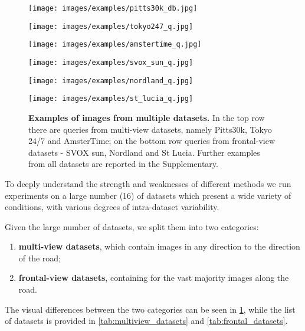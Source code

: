\documentclass[10pt,twocolumn,letterpaper]{article}
\begin{document}
 
\begin{figure}
    \begin{center}
    \begin{minipage}{.15\textwidth}
        \texttt{[image: images/examples/pitts30k\_db.jpg]}
    \end{minipage}
    \begin{minipage}{.15\textwidth}
        \texttt{[image: images/examples/tokyo247\_q.jpg]}
    \end{minipage}
    \begin{minipage}{.15\textwidth}
        \texttt{[image: images/examples/amstertime\_q.jpg]}
    \end{minipage}
    \begin{minipage}{.15\textwidth}
        \texttt{[image: images/examples/svox\_sun\_q.jpg]}
    \end{minipage}
    \begin{minipage}{.15\textwidth}
    \texttt{[image: images/examples/nordland\_q.jpg]}
    \end{minipage}
    \begin{minipage}{.15\textwidth}
    \texttt{[image: images/examples/st\_lucia\_q.jpg]}
    \end{minipage}
    \end{center}
    \caption{\textbf{Examples of images from multiple datasets.} In the top row there are queries from multi-view datasets, namely Pitts30k, Tokyo 24/7 and AmsterTime; on the bottom row queries from frontal-view datasets - SVOX sun, Nordland and St Lucia. Further examples from all datasets are reported in the Supplementary.}
    \label{fig:examples}
\end{figure}
 To deeply understand the strength and weaknesses of different methods we run experiments on a large number (16) of datasets which present a wide variety of conditions, with various degrees of intra-dataset variability.

Given the large number of datasets, we split them into two categories:
\begin{enumerate}[noitemsep,topsep=1pt]
    \item \textbf{multi-view datasets}, which contain images in any direction \wrt to the direction of the road;
    \item \textbf{frontal-view datasets}, containing for the vast majority images along the road.
\end{enumerate}
The visual differences between the two categories can be seen in \cref{fig:examples}, while the list of datasets is provided in \cref{tab:multiview_datasets} and \cref{tab:frontal_datasets}.
\end{document}
